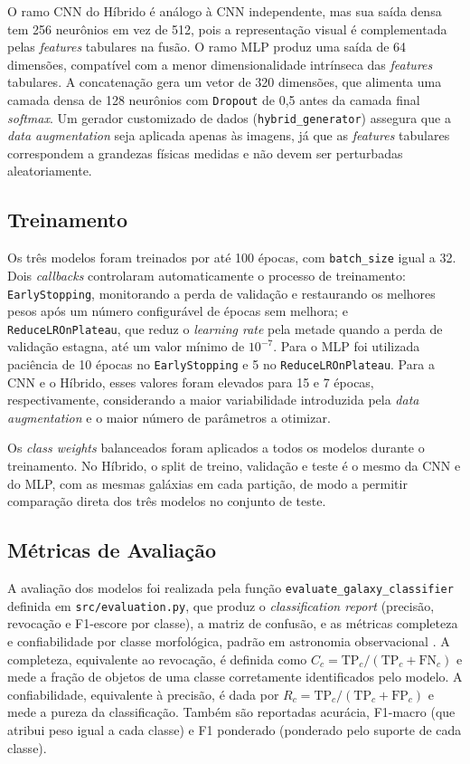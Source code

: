 \documentclass[12pt, a4paper]{article}
\begin{document}
O ramo CNN do Híbrido é análogo à CNN independente, mas sua saída
densa tem 256 neurônios em vez de 512, pois a representação visual é
complementada pelas \textit{features} tabulares na fusão. O ramo MLP
produz uma saída de 64 dimensões, compatível com a menor dimensionalidade
intrínseca das \textit{features} tabulares. A concatenação gera um vetor
de 320 dimensões, que alimenta uma camada densa de 128 neurônios com
\texttt{Dropout} de 0,5 antes da camada final \textit{softmax}. Um gerador
customizado de dados (\texttt{hybrid\_generator}) assegura que a
\textit{data augmentation} seja aplicada apenas às imagens, já que as
\textit{features} tabulares correspondem a grandezas físicas medidas e não
devem ser perturbadas aleatoriamente.

\subsection{Treinamento}

Os três modelos foram treinados por até 100 épocas, com
\texttt{batch\_size} igual a 32. Dois \textit{callbacks} controlaram
automaticamente o processo de treinamento: \texttt{EarlyStopping},
monitorando a perda de validação e restaurando os melhores pesos após um
número configurável de épocas sem melhora; e \texttt{ReduceLROnPlateau},
que reduz o \textit{learning rate} pela metade quando a perda de
validação estagna, até um valor mínimo de $10^{-7}$. Para o MLP foi
utilizada paciência de 10 épocas no \texttt{EarlyStopping} e 5 no
\texttt{ReduceLROnPlateau}. Para a CNN e o Híbrido, esses valores
foram elevados para 15 e 7 épocas, respectivamente, considerando a maior
variabilidade introduzida pela \textit{data augmentation} e o maior número
de parâmetros a otimizar.

Os \textit{class weights} balanceados foram aplicados a todos os modelos
durante o treinamento. No Híbrido, o split de treino, validação e
teste é o mesmo da CNN e do MLP, com as mesmas galáxias em cada partição,
de modo a permitir comparação direta dos três modelos no conjunto de
teste.

\subsection{Métricas de Avaliação}

A avaliação dos modelos foi realizada pela função
\texttt{evaluate\_galaxy\_classifier} definida em
\texttt{src/evaluation.py}, que produz o \textit{classification report}
(precisão, revocação e F1-escore por classe), a
matriz de confusão, e as métricas completeza e
confiabilidade por classe morfológica, padrão em astronomia
observacional \cite{hart2016}. A completeza, equivalente ao
revocação, é definida como
$C_c = \text{TP}_c / (\text{TP}_c + \text{FN}_c)$ e mede a fração de
objetos de uma classe corretamente identificados pelo modelo. A
confiabilidade, equivalente à precisão, é dada por
$R_c = \text{TP}_c / (\text{TP}_c + \text{FP}_c)$ e mede a pureza da
classificação. Também são reportadas acurácia, F1-macro
(que atribui peso igual a cada classe) e F1 ponderado (ponderado
pelo suporte de cada classe).
\end{document}
